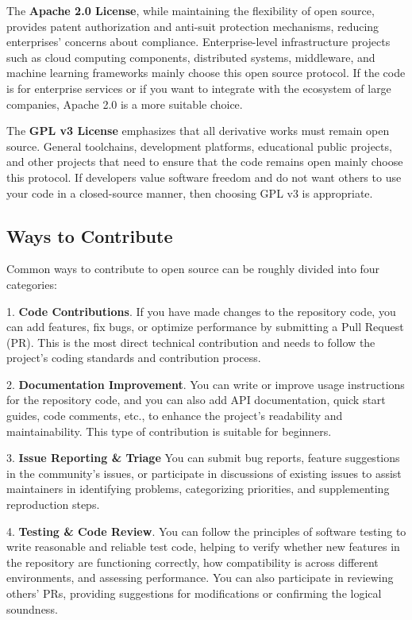 \documentclass[12pt]{article}
\begin{document}
The \textbf{Apache 2.0 License}, while maintaining the flexibility of open source, provides patent authorization and anti-suit protection mechanisms, reducing enterprises' concerns about compliance. Enterprise-level infrastructure projects such as cloud computing components, distributed systems, middleware, and machine learning frameworks mainly choose this open source protocol. If the code is for enterprise services or if you want to integrate with the ecosystem of large companies, Apache 2.0 is a more suitable choice. 

The \textbf{GPL v3 License} emphasizes that all derivative works must remain open source. General toolchains, development platforms, educational public projects, and other projects that need to ensure that the code remains open mainly choose this protocol. If developers value software freedom and do not want others to use your code in a closed-source manner, then choosing GPL v3 is appropriate.


\subsection{Ways to Contribute}

Common ways to contribute to open source can be roughly divided into four categories: 

1. \textbf{Code Contributions}. If you have made changes to the repository code, you can add features, fix bugs, or optimize performance by submitting a Pull Request (PR). This is the most direct technical contribution and needs to follow the project's coding standards and contribution process.

2. \textbf{Documentation Improvement}. You can write or improve usage instructions for the repository code, and you can also add API documentation, quick start guides, code comments, etc., to enhance the project's readability and maintainability. This type of contribution is suitable for beginners.

3. \textbf{Issue Reporting \& Triage} You can submit bug reports, feature suggestions in the community's issues, or participate in discussions of existing issues to assist maintainers in identifying problems, categorizing priorities, and supplementing reproduction steps.

4. \textbf{Testing \& Code Review}. You can follow the principles of software testing to write reasonable and reliable test code, helping to verify whether new features in the repository are functioning correctly, how compatibility is across different environments, and assessing performance. You can also participate in reviewing others' PRs, providing suggestions for modifications or confirming the logical soundness.
\end{document}
